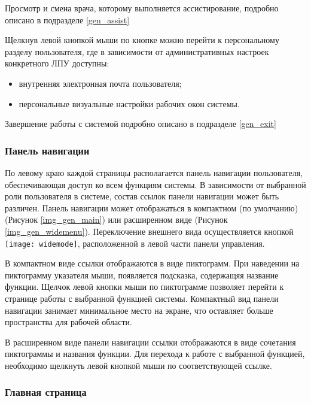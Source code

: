 {Просмотр и смена врача, которому выполняется ассистирование, подробно описано в подразделе \ref{gen_assist}
}{}


Щелкнув левой кнопкой мыши по кнопке  можно перейти к персональному разделу пользователя, где в зависимости от административных настроек конкретного ЛПУ доступны:

\begin{itemize}
 \item внутренняя электронная почта пользователя;
 \item персональные визуальные настройки рабочих окон системы.
\end{itemize}

Завершение работы с системой подробно описано в подразделе \ref{gen_exit}

\subsubsection{Панель навигации} \label{gen_navpanel}

По левому краю каждой страницы располагается панель навигации пользователя, обеспечивающая доступ ко всем функциям системы. В зависимости от выбранной роли пользователя в системе, состав ссылок панели навигации может быть различен. Панель навигации  может отображаться в компактном (по умолчанию) (Рисунок \ref{img_gen_main}) или расширенном виде (Рисунок \ref{img_gen_widemenu}). Переключение внешнего вида осуществляется кнопкой \texttt{[image: widemode]}, расположенной в левой части панели управления.

В компактном виде ссылки отображаются в виде пиктограмм. При наведении на пиктограмму указателя мыши, появляется подсказка, содержащяя название функции. Щелчок левой кнопки мыши по пиктограмме позволяет перейти к странице работы с выбранной функцией системы. Компактный вид панели навигации занимает минимальное место на экране, что оставляет больше пространства для рабочей области. 

В расширенном виде панели навигации ссылки отображаются в виде сочетания пиктограммы и названия функции. Для перехода к работе с выбранной функцией, необходимо щелкнуть левой кнопкой мыши по соответствующей ссылке.

\subsubsection{Главная страница}

